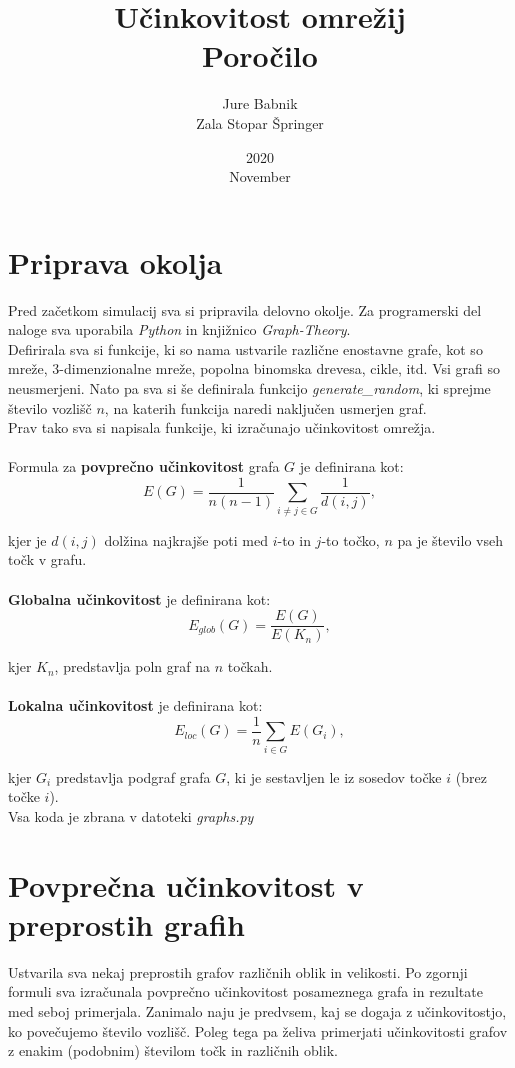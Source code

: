 \documentclass[a4paper, 16pt]{article}
\title{%
    Učinkovitost omrežij \\ 
    \large Poročilo}
\date{2020\\ November}
\author{Jure Babnik \\  Zala Stopar Špringer}
\begin{document}
\maketitle
{}


\newpage

\tableofcontents

\newpage
{}

\section{Priprava okolja}

Pred začetkom simulacij sva si pripravila delovno okolje. Za programerski del naloge sva uporabila \emph{Python}
in knjižnico \emph{Graph-Theory}.\\ 
Defirirala sva si funkcije, ki so nama ustvarile različne enostavne grafe, kot so mreže, 3-dimenzionalne mreže, 
popolna binomska drevesa, cikle, itd. Vsi grafi so neusmerjeni. Nato pa sva si še definirala funkcijo \emph{generate\_random}, 
ki sprejme število vozlišč $n$, na katerih funkcija naredi naključen usmerjen graf.\\
Prav tako sva si napisala funkcije, ki izračunajo učinkovitost omrežja. \\
\\
Formula za \textbf{povprečno učinkovitost} grafa $G$ je definirana kot:
$$ E(G) = \frac{1}{n(n-1)} \sum_{i\neq j \in G} \frac{1}{d(i,j)},$$

kjer je $d(i,j)$ dolžina najkrajše poti med $i$-to in $j$-to točko, $n$ pa je število vseh točk v grafu.\\
\\
\textbf{Globalna učinkovitost} je definirana kot:
$$ E_{glob}(G) = \frac{E(G)}{E(K_n)}, $$

kjer $K_n$, predstavlja poln graf na $n$ točkah.\\
\\
\textbf{Lokalna učinkovitost} je definirana kot:
$$ E_{loc}(G) = \frac{1}{n} \sum_{i \in G} E(G_i), $$

kjer $G_i$ predstavlja podgraf grafa $G$, ki je sestavljen le iz sosedov točke $i$ (brez točke $i$). \\

Vsa koda je zbrana v datoteki \emph{graphs.py}

\newpage

\section{Povprečna učinkovitost v preprostih grafih}
Ustvarila sva nekaj preprostih grafov različnih oblik in velikosti. 
Po zgornji formuli sva izračunala povprečno učinkovitost posameznega grafa in rezultate med seboj primerjala.
Zanimalo naju je predvsem, kaj se dogaja z učinkovitostjo, ko povečujemo število vozlišč.
Poleg tega pa želiva primerjati učinkovitosti grafov z enakim (podobnim) številom točk in različnih oblik.
\end{document}
